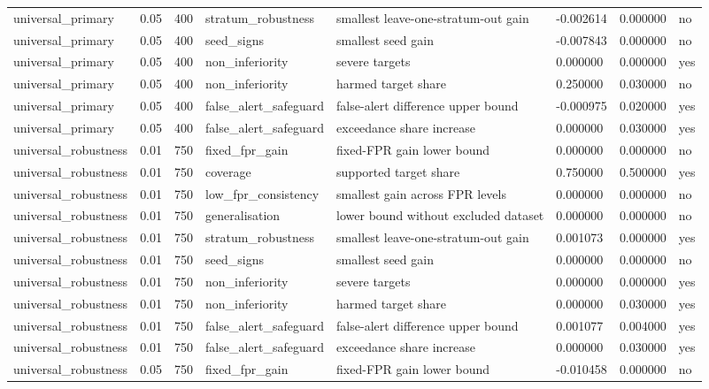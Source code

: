 \begin{tabular}{llllllll}
universal\_primary & 0.05 & 400 & stratum\_robustness & smallest leave-one-stratum-out gain & -0.002614 & 0.000000 & no \\
universal\_primary & 0.05 & 400 & seed\_signs & smallest seed gain & -0.007843 & 0.000000 & no \\
universal\_primary & 0.05 & 400 & non\_inferiority & severe targets & 0.000000 & 0.000000 & yes \\
universal\_primary & 0.05 & 400 & non\_inferiority & harmed target share & 0.250000 & 0.030000 & no \\
universal\_primary & 0.05 & 400 & false\_alert\_safeguard & false-alert difference upper bound & -0.000975 & 0.020000 & yes \\
universal\_primary & 0.05 & 400 & false\_alert\_safeguard & exceedance share increase & 0.000000 & 0.030000 & yes \\
universal\_robustness & 0.01 & 750 & fixed\_fpr\_gain & fixed-FPR gain lower bound & 0.000000 & 0.000000 & no \\
universal\_robustness & 0.01 & 750 & coverage & supported target share & 0.750000 & 0.500000 & yes \\
universal\_robustness & 0.01 & 750 & low\_fpr\_consistency & smallest gain across FPR levels & 0.000000 & 0.000000 & no \\
universal\_robustness & 0.01 & 750 & generalisation & lower bound without excluded dataset & 0.000000 & 0.000000 & no \\
universal\_robustness & 0.01 & 750 & stratum\_robustness & smallest leave-one-stratum-out gain & 0.001073 & 0.000000 & yes \\
universal\_robustness & 0.01 & 750 & seed\_signs & smallest seed gain & 0.000000 & 0.000000 & no \\
universal\_robustness & 0.01 & 750 & non\_inferiority & severe targets & 0.000000 & 0.000000 & yes \\
universal\_robustness & 0.01 & 750 & non\_inferiority & harmed target share & 0.000000 & 0.030000 & yes \\
universal\_robustness & 0.01 & 750 & false\_alert\_safeguard & false-alert difference upper bound & 0.001077 & 0.004000 & yes \\
universal\_robustness & 0.01 & 750 & false\_alert\_safeguard & exceedance share increase & 0.000000 & 0.030000 & yes \\
universal\_robustness & 0.05 & 750 & fixed\_fpr\_gain & fixed-FPR gain lower bound & -0.010458 & 0.000000 & no \\

\end{tabular}
